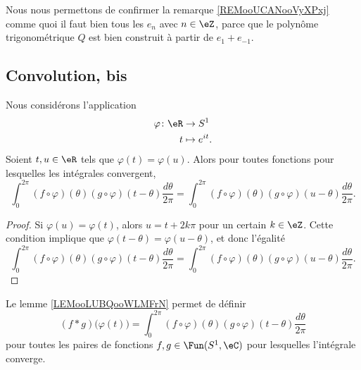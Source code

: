 Nous nous permettons de confirmer la remarque \ref{REMooUCANooVyXPxj} comme quoi il faut bien tous les \( e_n\) avec \( n\in \eZ\), parce que le polynôme trigonométrique \( Q\) est bien construit à partir de \( e_1+e_{-1}\).

\subsection{Convolution, bis}

\begin{lemma}       \label{LEMooLUBQooWLMFrN}
	Nous considérons l'application
	\begin{equation}
		\begin{aligned}
			\varphi\colon \eR & \to S^1         \\
			t                 & \mapsto e^{it}.
		\end{aligned}
	\end{equation}
	Soient \( t,u\in \eR\) tels que \( \varphi(t)=\varphi(u)\). Alors pour toutes fonctions pour lesquelles les intégrales convergent,
	\begin{equation}
		\int_0^{2\pi}(f\circ \varphi)(\theta)(g\circ\varphi)(t-\theta)\frac{ d\theta }{ 2\pi }=\int_0^{2\pi}(f\circ \varphi)(\theta)(g\circ\varphi)(u-\theta)\frac{ d\theta }{ 2\pi }.
	\end{equation}
\end{lemma}

\begin{proof}
	Si \( \varphi(u)=\varphi(t)\), alors \( u=t+2k\pi\) pour un certain \( k\in \eZ\). Cette condition implique que \( \varphi(t-\theta)=\varphi(u-\theta)\), et donc l'égalité
	\begin{equation}
		\int_0^{2\pi}(f\circ \varphi)(\theta)(g\circ\varphi)(t-\theta)\frac{ d\theta }{ 2\pi }=\int_0^{2\pi}(f\circ \varphi)(\theta)(g\circ\varphi)(u-\theta)\frac{ d\theta }{ 2\pi }.
	\end{equation}
\end{proof}

\begin{definition}
	Le lemme \ref{LEMooLUBQooWLMFrN} permet de définir
	\begin{equation}
		(f*g)\big( \varphi(t) \big)=\int_0^{2\pi}(f\circ \varphi)(\theta)(g\circ\varphi)(t-\theta)\frac{ d\theta }{ 2\pi }
	\end{equation}
	pour toutes les paires de fonctions \( f,g\in \Fun(S^1,\eC)\) pour lesquelles l'intégrale converge.
\end{definition}


